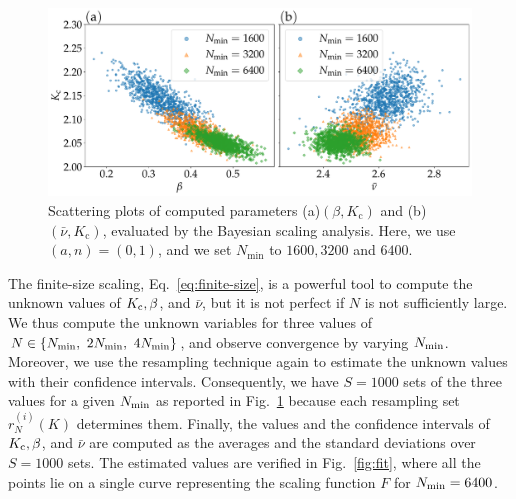 \begin{figure}[t]
  \begin{center}
    \includegraphics[width=\textwidth]{figs/critical_val_scatter.pdf}
  \end{center}
  \caption{
    Scattering plots of computed parameters (a)$(\beta,K_{\mathrm{c}})$ and (b)$(\bar{\nu},K_{\mathrm{c}})$, 
    evaluated by the Bayesian scaling analysis.
    Here, we use $(a,n)=(0,1)$, and we set $N_{\min}$ to $1600,3200$ and $6400$.
  }
  \label{fig:scatter}
\end{figure}

The finite-size scaling, Eq.~\eqref{eq:finite-size}, is
a powerful tool to compute the unknown values of
$K_{\rm c},\beta$, and $\bar{\nu}$,
but it is not perfect if $N$ is not sufficiently large.
We thus compute the unknown variables
for three values of $N\in\{N_{\rm min},~ 2N_{\rm min}, ~4N_{\rm min}\}$,
and observe convergence by varying $N_{\rm min}$.
Moreover, we use the resampling technique again
to estimate the unknown values with their confidence intervals.
Consequently, we have $S=1000$ sets of the three values
for a given $N_{\rm min}$ as reported in Fig.~\ref{fig:scatter}
because each resampling set $r_{N}^{(i)}(K)$ determines them.
Finally, the values and the confidence intervals
of $K_{\rm c},\beta$, and $\bar{\nu}$
are computed as the averages and the standard deviations
over $S=1000$ sets.
The estimated values are verified in Fig.~\ref{fig:fit},
where all the points lie on a single curve representing
the scaling function $F$ for $N_{\rm min}=6400$.


